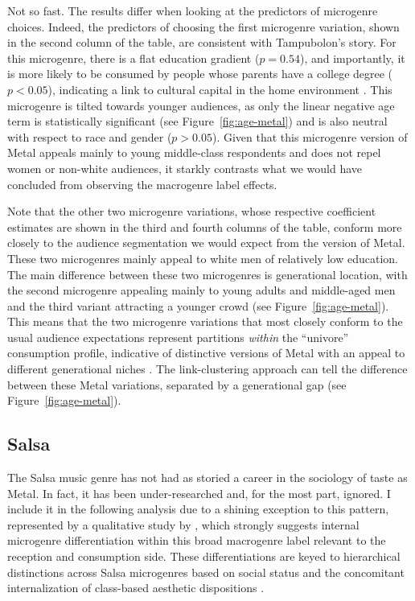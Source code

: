 \documentclass[a4paper,12pt]{extarticle}
\begin{document}
Not so fast. The results differ when looking at the predictors of microgenre choices. Indeed, the predictors of choosing the first microgenre variation, shown in the second column of the table, are consistent with Tampubolon's story. For this microgenre, there is a flat education gradient ($p = 0.54$), and importantly, it is more likely to be consumed by people whose parents have a college degree ($p < 0.05$), indicating a link to cultural capital in the home environment \citep{bourdieu84}. This microgenre is tilted towards younger audiences, as only the linear negative age term is statistically significant (see Figure~\ref{fig:age-metal}) and is also neutral with respect to race and gender ($p > 0.05$). Given that this microgenre version of Metal appeals mainly to young middle-class respondents and does not repel women or non-white audiences, it starkly contrasts what we would have concluded from observing the macrogenre label effects. 

Note that the other two microgenre variations, whose respective coefficient estimates are shown in the third and fourth columns of the table, conform more closely to the audience segmentation we would expect from the version of Metal. These two microgenres mainly appeal to white men of relatively low education. The main difference between these two microgenres is generational location, with the second microgenre appealing mainly to young adults and middle-aged men and the third variant attracting a younger crowd (see Figure~\ref{fig:age-metal}). This means that the two microgenre variations that most closely conform to the usual audience expectations represent partitions \textit{within} the ``univore'' consumption profile, indicative of distinctive versions of Metal with an appeal to different generational niches \citep{koch2020evolutionary}. The link-clustering approach can tell the difference between these Metal variations, separated by a generational gap (see Figure~\ref{fig:age-metal}).

\subsection{Salsa}
The Salsa music genre has not had as storied a career in the sociology of taste as Metal. In fact, it has been under-researched and, for the most part, ignored. I include it in the following analysis due to a shining exception to this pattern, represented by a qualitative study by \citet{Bachmayer2014-pk}, which strongly suggests internal microgenre differentiation within this broad macrogenre label relevant to the reception and consumption side. These differentiations are keyed to hierarchical distinctions across Salsa microgenres based on social status and the concomitant internalization of class-based aesthetic dispositions \citep{lizardo2012reconceptualizing}. 
\end{document}
